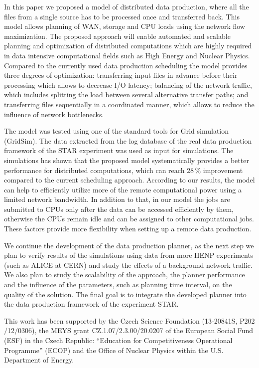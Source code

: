 \documentclass{svjour3}                     %
\begin{document}
In this paper we proposed a model of distributed data production, where all
the files from a single source has to be processed once and transferred back.
This model allows planning of WAN, storage and CPU loads using the network
flow maximization. The proposed approach will enable automated and scalable planning and optimization of distributed computations which are highly required in data intensive computational fields such as High Energy and Nuclear Physics. Compared to the currently used data production scheduling the model provides three degrees of optimization: transferring input files in advance before their processing which allows to decrease I/O latency; balancing of the network traffic, which includes splitting the load between several alternative transfer paths; and transferring files sequentially in a coordinated manner, which allows to reduce the influence of network bottlenecks.

The model was tested using one of the standard tools for Grid simulation (GridSim). The data extracted from the log database of the real data production framework of the STAR experiment was used as input for simulations. The simulations has shown that the proposed model systematically provides a better performance for distributed computations, which can reach 28\,\% improvement compared to the current scheduling approach. According to our results, the model can help to efficiently utilize more of the remote computational power using a limited network bandwidth. In addition to that, in our model the jobs are submitted to CPUs only after the data can be accessed efficiently by them, otherwise the CPUs remain idle and can be assigned to other computational jobs. These factors provide more flexibility when setting up a remote data production.

We continue the development of the data production planner, as the next step we plan to verify results of the simulations using data from more HENP experiments (such as ALICE at CERN) and study the effects of a background network traffic. We also plan to study the scalability of the approach, the planner performance and the influence of the parameters, such as planning time interval, on the quality of the solution. The final goal is to integrate the developed planner into the data production framework of the experiment STAR.


\begin{acknowledgements}
This work has been supported by the Czech Science Foundation
(13-20841S, P202$/$12$/$0306),  the MEYS grant CZ.1.07/2.3.00/20.0207 of the European Social Fund (ESF) in the Czech Republic: “Education for Competitiveness Operational Programme” (ECOP) and the Office of Nuclear Physics within the U.S. Department of Energy.  
\end{acknowledgements}

{}

\end{document}
